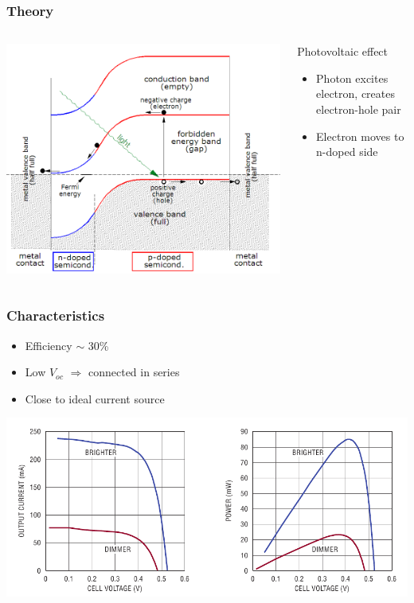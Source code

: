 \documentclass{beamer}
\begin{document}
\begin{frame}
  \frametitle{Theory}
\begin{columns}
  \begin{column}{.6\textwidth}
    \includegraphics[width=\textwidth]{./Slike/PV-band-diagram}
  \end{column}
  \begin{column}{.4\textwidth}
    \begin{block}{Photovoltaic effect}
    \begin{itemize}
      \item Photon excites electron, creates electron-hole pair
      \item Electron moves to n-doped side
    \end{itemize}
    \end{block}
  \end{column}
\end{columns}

\end{frame}

\begin{frame}
  \frametitle{Characteristics}
  \begin{itemize}
    \item Efficiency $\sim$ 30\%
    \item Low $V_{oc}$ $\Rightarrow$ connected in series
    \item Close to ideal current source
  \end{itemize}
\includegraphics[width=\textwidth]{./Slike/PV-power-curve}


\end{frame}
\end{document}
